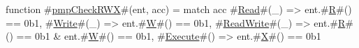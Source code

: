 function #\hyperref[sailRISCVzpmpCheckRWX]{pmpCheckRWX}#(ent, acc) = {
  match acc {
    #\hyperref[sailRISCVzRead]{Read}#(_)      => ent.#\hyperref[sailRISCVzR]{R}#() == 0b1,
    #\hyperref[sailRISCVzWrite]{Write}#(_)     => ent.#\hyperref[sailRISCVzW]{W}#() == 0b1,
    #\hyperref[sailRISCVzReadWrite]{ReadWrite}#(_) => ent.#\hyperref[sailRISCVzR]{R}#() == 0b1 & ent.#\hyperref[sailRISCVzW]{W}#() == 0b1,
    #\hyperref[sailRISCVzExecute]{Execute}#()    => ent.#\hyperref[sailRISCVzX]{X}#() == 0b1
  }
}
